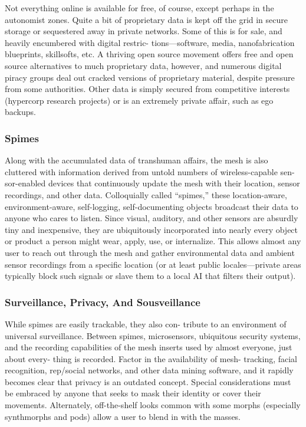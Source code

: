 Not everything online is available for free, of course, 
except perhaps in the autonomist zones. Quite a bit of 
proprietary data is kept off the grid in secure storage 
or sequestered away in private networks. Some of this 
is for sale, and heavily encumbered with digital restric-
tions—software, media, nanofabrication blueprints, 
skillsofts, etc. A thriving open source movement offers 
free and open source alternatives to much proprietary 
data, however, and numerous digital piracy groups 
deal out cracked versions of proprietary material, 
despite pressure from some authorities. Other data is 
simply secured from competitive interests (hypercorp 
research projects) or is an extremely private affair, 
such as ego backups.

\subsubsection{Spimes}

Along with the accumulated data of transhuman 
affairs, the mesh is also cluttered with information 
derived from untold numbers of wireless-capable sen-
sor-enabled devices that continuously update the mesh 
with their location, sensor recordings, and other data. 
Colloquially called ``spimes,'' these location-aware, 
environment-aware, self-logging, self-documenting 
objects broadcast their data to anyone who cares to 
listen. Since visual, auditory, and other sensors are 
absurdly tiny and inexpensive, they are ubiquitously 
incorporated into nearly every object or product a 
person might wear, apply, use, or internalize. This 
allows almost any user to reach out through the mesh 
and gather environmental data and ambient sensor 
recordings from a specific location (or at least public 
locales—private areas typically block such signals or 
slave them to a local AI that filters their output).

\subsubsection{Surveillance, Privacy, And Sousveillance}

While spimes are easily trackable, they also con-
tribute to an environment of universal surveillance. 
Between spimes, microsensors, ubiquitous security 
systems, and the recording capabilities of the mesh 
inserts used by almost everyone, just about every-
thing is recorded. Factor in the availability of mesh-
tracking, facial recognition, rep/social networks, and 
other data mining software, and it rapidly becomes 
clear that privacy is an outdated concept. Special 
considerations must be embraced by anyone that 
seeks to mask their identity or cover their movements. 
Alternately, off-the-shelf looks common with some 
morphs (especially synthmorphs and pods) allow a 
user to blend in with the masses.

